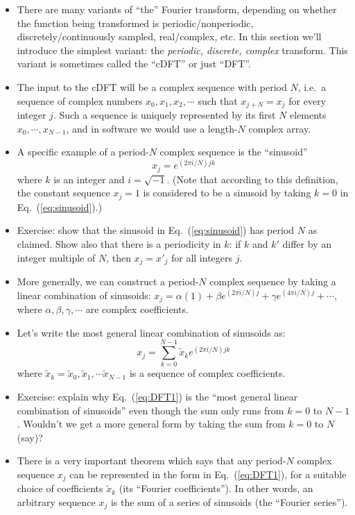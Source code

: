 \documentclass[aps,prd,superscriptaddress,groupedaddress,nofootinbib,nobibnotes]{revtex4}
\newcommand{\be}{\begin{equation}}
\newcommand{\ee}{\end{equation}}
\def\tx{{\tilde x}}
\begin{document}
\begin{itemize}
\item There are many variants of ``the'' Fourier transform, depending on whether the function
 being transformed is periodic/nonperiodic, discretely/continuously sampled, real/complex, etc.
 In this section we'll introduce the simplest variant: the {\em periodic, discrete, complex} transform.
 This variant is sometimes called the ``cDFT'' or just ``DFT''.
\item The input to the cDFT will be a complex sequence with period $N$, i.e.~a sequence of
 complex numbers $x_0, x_1, x_2, \cdots$ such that $x_{j+N} = x_j$ for every integer $j$.
 Such a sequence is uniquely represented by its first $N$ elements $x_0, \cdots, x_{N-1}$,
 and in software we would use a length-$N$ complex array.
\item A specific example of a period-$N$ complex sequence is the ``sinusoid''
\be
 x_j = e^{(2\pi i / N) j k}   \label{eq:sinusoid}
\ee
 where $k$ is an integer and $i=\sqrt{-1}$.  (Note that according to this definition, the
 constant sequence $x_j = 1$ is considered to be a sinusoid by taking $k=0$ in Eq.~(\ref{eq:sinusoid}).)
\item Exercise: show that the sinusoid in Eq.~(\ref{eq:sinusoid}) has period $N$ as claimed.
 Show also that there is a periodicity in $k$: if $k$ and $k'$ differ by an integer multiple of $N$,
 then $x_j = x'_j$ for all integers $j$.
\item More generally, we can construct a period-$N$ complex sequence by taking a linear combination
 of sinusoids: $x_j = \alpha (1) + \beta e^{(2\pi i/N) j} + \gamma e^{(4\pi i/N) j} + \cdots$,
 where $\alpha, \beta, \gamma, \cdots$ are complex coefficients.
\item Let's write the most general linear combination of sinusoids as:
\be
 x_j = \sum_{k=0}^{N-1} \tx_k e^{(2\pi i / N) j k}  \label{eq:DFT1}
\ee
 where $\tx_k = \tx_0, \tx_1, \cdots \tx_{N-1}$ is a sequence of complex coefficients.
\item Exercise: explain why Eq.~(\ref{eq:DFT1}) is the ``most general linear combination of sinusoids''
 even though the sum only runs from $k=0$ to $N-1$.  Wouldn't we get a more general form by taking
 the sum from $k=0$ to $N$ (say)?
\item There is a very important theorem which says that any period-$N$ complex sequence $x_j$
 can be represented in the form in Eq.~(\ref{eq:DFT1}), for a suitable choice of coefficients $\tx_k$
 (its ``Fourier coefficients'').
 In other words, an arbitrary sequence $x_j$ is the sum of a series of sinusoids (the ``Fourier series'').

\end{itemize}
\end{document}
